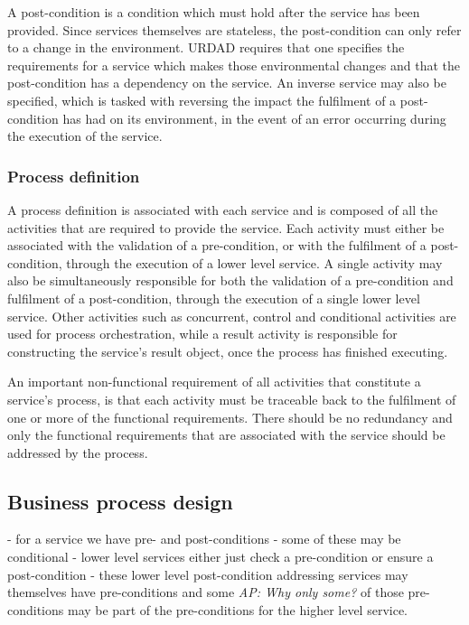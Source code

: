 A post-condition is a condition which must hold after the service has been provided. Since services themselves are stateless, the post-condition can only refer to a change in the environment. URDAD requires that one specifies the requirements for a service which makes those environmental changes and that the post-condition has a dependency on the service. An inverse service may also be specified, which is tasked with reversing the impact the fulfilment of a post-condition has had on its environment, in the event of an error occurring during the execution of the service.

\subsubsection{Process definition}

A process definition is associated with each service and is composed of all the activities that are required to provide the service. Each activity must either be associated with the validation of a pre-condition, or with the fulfilment of a post-condition, through the execution of a lower level service. A single activity may also be simultaneously responsible for both the validation of a pre-condition and fulfilment of a post-condition, through the execution of a single lower level service. Other activities such as concurrent, control and conditional activities are used for process orchestration, while a result activity is responsible for constructing the service's result object, once the process has finished executing. 

An important non-functional requirement of all activities that constitute a service's process, is that each activity must be traceable back to the fulfilment of one or more of the functional requirements. There should be no redundancy and only the functional requirements that are associated with the service should be addressed by the process.

\subsection{Business process design}
- for a service we have pre- and post-conditions - some of these may be conditional
- lower level services either just check a pre-condition or ensure a post-condition
- these lower level post-condition addressing services may themselves have pre-conditions and some \emph{AP: Why only some?} of those pre-conditions may be part of the pre-conditions for the higher level service.

